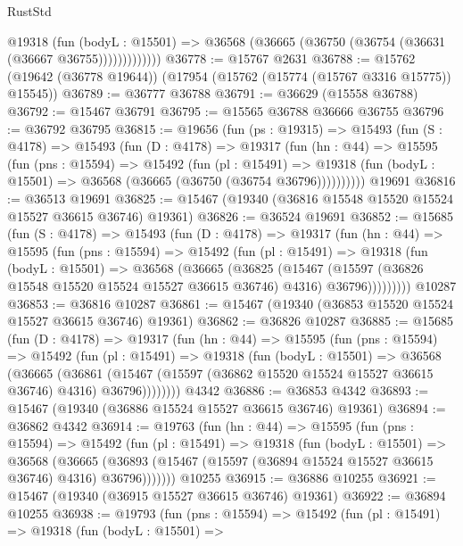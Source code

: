 \begin{lexlean}{RustStd}
\begin{coremodule}
                @19318
                  (fun (bodyL : @15501) =>
                  @36568 (@36665 (@36750 (@36754 (@36631 (@36667 @36755)))))))))))))
@36778 := @15767 @2631
@36788 := @15762 (@19642 (@36778 @19644)) (@17954 (@15762 (@15774 (@15767 @3316 @15775)) @15545))
@36789 := @36777 @36788
@36791 := @36629 (@15558 @36788)
@36792 := @15467 @36791
@36795 := @15565 @36788 @36666 @36755
@36796 := @36792 @36795
@36815 := @19656
    (fun (ps : @19315) =>
    @15493
      (fun (S : @4178) =>
      @15493
        (fun (D : @4178) =>
        @19317
          (fun (hn : @44) =>
          @15595
            (fun (pns : @15594) =>
            @15492
              (fun (pl : @15491) =>
              @19318 (fun (bodyL : @15501) => @36568 (@36665 (@36750 (@36754 @36796))))))))))
    @19691
@36816 := @36513 @19691
@36825 := @15467 (@19340 (@36816 @15548 @15520 @15524 @15527 @36615 @36746) @19361)
@36826 := @36524 @19691
@36852 := @15685
    (fun (S : @4178) =>
    @15493
      (fun (D : @4178) =>
      @19317
        (fun (hn : @44) =>
        @15595
          (fun (pns : @15594) =>
          @15492
            (fun (pl : @15491) =>
            @19318
              (fun (bodyL : @15501) =>
              @36568
                (@36665
                  (@36825
                    (@15467
                      (@15597 (@36826 @15548 @15520 @15524 @15527 @36615 @36746) @4316)
                      @36796)))))))))
    @10287
@36853 := @36816 @10287
@36861 := @15467 (@19340 (@36853 @15520 @15524 @15527 @36615 @36746) @19361)
@36862 := @36826 @10287
@36885 := @15685
    (fun (D : @4178) =>
    @19317
      (fun (hn : @44) =>
      @15595
        (fun (pns : @15594) =>
        @15492
          (fun (pl : @15491) =>
          @19318
            (fun (bodyL : @15501) =>
            @36568
              (@36665
                (@36861
                  (@15467 (@15597 (@36862 @15520 @15524 @15527 @36615 @36746) @4316) @36796))))))))
    @4342
@36886 := @36853 @4342
@36893 := @15467 (@19340 (@36886 @15524 @15527 @36615 @36746) @19361)
@36894 := @36862 @4342
@36914 := @19763
    (fun (hn : @44) =>
    @15595
      (fun (pns : @15594) =>
      @15492
        (fun (pl : @15491) =>
        @19318
          (fun (bodyL : @15501) =>
          @36568
            (@36665
              (@36893 (@15467 (@15597 (@36894 @15524 @15527 @36615 @36746) @4316) @36796)))))))
    @10255
@36915 := @36886 @10255
@36921 := @15467 (@19340 (@36915 @15527 @36615 @36746) @19361)
@36922 := @36894 @10255
@36938 := @19793
    (fun (pns : @15594) =>
    @15492
      (fun (pl : @15491) =>
      @19318
        (fun (bodyL : @15501) =>

\end{coremodule}
\end{lexlean}
